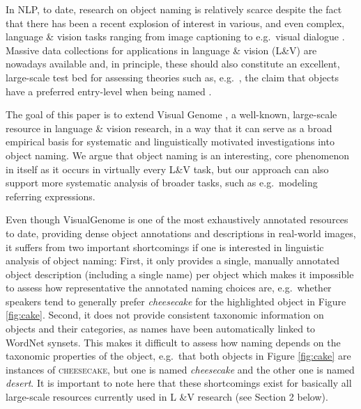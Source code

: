 \documentclass[11pt]{article}
\newcommand{\refexp}[1]{\textsl{#1}}
\newcommand{\cat}[1]{\textsc{#1}}
\begin{document}
In NLP, to date, research on object naming is relatively scarce despite the fact that
 there has been a recent explosion of interest in various, and even complex, language \& vision tasks ranging from image captioning \cite{fangetal:2015,devlin:imcaqui,Bernardietal:automatic} to e.g.\ visual dialogue \cite{das2017visual,vries2017guesswhat}. Massive data collections for applications in language \& vision (L\&V) are nowadays available and, in principle, these should also constitute an excellent, large-scale test bed for assessing  theories such as, e.g.\ , the claim that objects have a preferred entry-level when being named  \cite{rosch1976basic}.

The goal of this paper is to extend Visual Genome  \cite{krishna2016visualgenome}, a well-known, large-scale resource in language \& vision research, in a way that it can serve as a broad empirical basis for systematic and linguistically motivated investigations into object naming. 
We argue that object naming is an interesting, core phenomenon in itself as it occurs in virtually every L\&V task, but our approach can also support more systematic analysis of broader tasks, such as e.g.\ modeling referring expressions.

Even though VisualGenome is one of the most exhaustively annotated resources to date, providing dense object annotations and descriptions in real-world images, it suffers from two important shortcomings if one is interested in linguistic analysis of object naming:  
First, it only provides a single, manually annotated object description (including a single name) per object which makes it impossible to assess how representative the annotated naming choices are, e.g.\ whether speakers tend to generally prefer \refexp{cheesecake} for the highlighted object in Figure \ref{fig:cake}.
Second, it does not provide consistent taxonomic information on objects and their categories, as names have been automatically linked to WordNet synsets. 
This makes it difficult to assess how naming depends on the taxonomic properties of the object, e.g.\  that both objects in Figure \ref{fig:cake} are instances of \cat{cheesecake}, but one is named \refexp{cheesecake} and the other one is named \refexp{desert}. It is important to note here that these shortcomings exist for basically all large-scale resources currently used in L \&V research (see Section 2 below).
\end{document}

